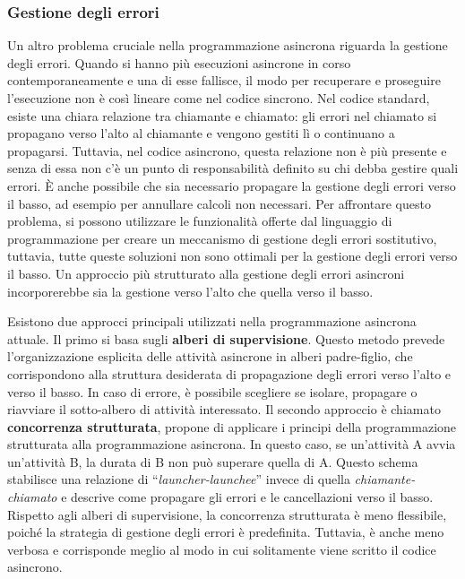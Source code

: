 \documentclass[12pt,a4paper,openright,twoside]{book}
\begin{document}
\subsubsection{Gestione degli errori}
Un altro problema cruciale nella programmazione asincrona riguarda la gestione degli errori. Quando si hanno più esecuzioni asincrone in corso contemporaneamente e una di esse fallisce, il modo per recuperare e proseguire l'esecuzione non è così lineare come nel codice sincrono. Nel codice standard, esiste una chiara relazione tra chiamante e chiamato: gli errori nel chiamato si propagano verso l'alto al chiamante e vengono gestiti lì o continuano a propagarsi. Tuttavia, nel codice asincrono, questa relazione non è più presente e senza di essa non c'è un punto di responsabilità definito su chi debba gestire quali errori. È anche possibile che sia necessario propagare la gestione degli errori verso il basso, ad esempio per annullare calcoli non necessari.
Per affrontare questo problema, si possono utilizzare le funzionalità offerte dal linguaggio di programmazione per creare un meccanismo di gestione degli errori sostitutivo, tuttavia, tutte queste soluzioni non sono ottimali per la gestione degli errori verso il basso.
Un approccio più strutturato alla gestione degli errori asincroni incorporerebbe sia la gestione verso l'alto che quella verso il basso. 

Esistono due approcci principali utilizzati nella programmazione asincrona attuale. Il primo si basa sugli \textbf{alberi di supervisione}. Questo metodo prevede l'organizzazione esplicita delle attività asincrone in alberi padre-figlio, che corrispondono alla struttura desiderata di propagazione degli errori verso l'alto e verso il basso. In caso di errore, è possibile scegliere se isolare, propagare o riavviare il sotto-albero di attività interessato. Il secondo approccio è chiamato \textbf{concorrenza strutturata}, propone di applicare i principi della programmazione strutturata alla programmazione asincrona. In questo caso, se un'attività A avvia un'attività B, la durata di B non può superare quella di A. Questo schema stabilisce una relazione di ``\textit{launcher-launchee}'' invece di quella \textit{chiamante-chiamato} e descrive come propagare gli errori e le cancellazioni verso il basso.
Rispetto agli alberi di supervisione, la concorrenza strutturata è meno flessibile, poiché la strategia di gestione degli errori è predefinita. Tuttavia, è anche meno verbosa e corrisponde meglio al modo in cui solitamente viene scritto il codice asincrono.
\end{document}
